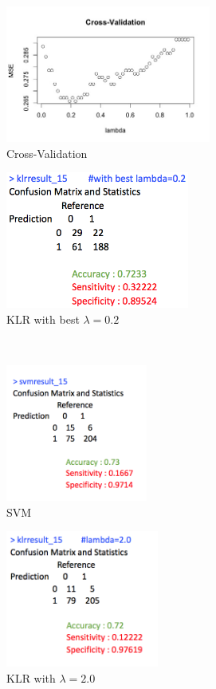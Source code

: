 \documentclass[11pt, oneside]{article}   	%
\begin{document}
\begin{figure}[!h]
       \centering
        \begin{subfigure}[b]{0.475\textwidth}
            \centering
            \includegraphics[width=\textwidth, height=4.5cm]{lambda_15.jpeg}
            \caption{\small Cross-Validation}\label{lambda_15.jpeg}
        \end{subfigure}
        \hfil
        \begin{subfigure}[b]{0.475\textwidth}
            \centering
            \includegraphics[width=\textwidth, height=4.5cm]{klr_15_best}
            \caption{\small KLR with best $\lambda=0.2$} \label{klr_15_best}
        \end{subfigure} \\ \hspace{1em}
        \centering
        \begin{subfigure}[b]{0.475\textwidth}
            \centering
            \includegraphics[width=\textwidth, height=4.5cm]{svm_15}
            \caption{\small SVM}\label{svm_15}
        \end{subfigure}
        \hfil
        \begin{subfigure}[b]{0.475\textwidth}
            \centering
            \includegraphics[width=\textwidth, height=4.5cm]{klr_15}
            \caption{\small KLR with $\lambda=2.0$}\label{klr_15}
        \end{subfigure}
        \caption{}
\end{figure}
\end{document}
